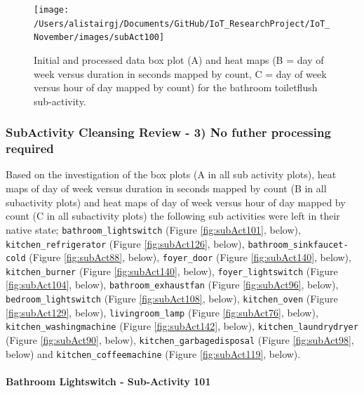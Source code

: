 \documentclass[11pt,]{article}
\let\oldparagraph\paragraph
\renewcommand{\paragraph}[1]{\oldparagraph{#1}\mbox{}}
\begin{document}
\begin{figure}[H]

{\centering \texttt{[image: /Users/alistairgj/Documents/GitHub/IoT\_ResearchProject/IoT\_November/images/subAct100]} 

}

\caption{Initial and processed data box plot (A) and heat maps (B = day of week versus duration in seconds mapped by count, C = day of week versus hour of day mapped by count) for the bathroom toiletflush sub-activity.}\label{fig:subAct100}
\end{figure}

\hypertarget{subactivity-cleansing-review---3-no-futher-processing-required}{%
\subsubsection{SubActivity Cleansing Review - 3) No futher processing
required}\label{subactivity-cleansing-review---3-no-futher-processing-required}}

Based on the investigation of the box plots (A in all sub activity
plots), heat maps of day of week versus duration in seconds mapped by
count (B in all subactivity plots) and heat maps of day of week versus
hour of day mapped by count (C in all subactivity plots) the following
sub activities were left in their native state;
\texttt{bathroom\_lightswitch} (Figure \ref{fig:subAct101}, below),
\texttt{kitchen\_refrigerator} (Figure \ref{fig:subAct126}, below),
\texttt{bathroom\_sinkfaucet-cold} (Figure \ref{fig:subAct88}, below),
\texttt{foyer\_door} (Figure \ref{fig:subAct140}, below),
\texttt{kitchen\_burner} (Figure \ref{fig:subAct140}, below),
\texttt{foyer\_lightswitch} (Figure \ref{fig:subAct104}, below),
\texttt{bathroom\_exhaustfan} (Figure \ref{fig:subAct96}, below),
\texttt{bedroom\_lightswitch} (Figure \ref{fig:subAct108}, below),
\texttt{kitchen\_oven} (Figure \ref{fig:subAct129}, below),
\texttt{livingroom\_lamp} (Figure \ref{fig:subAct76}, below),
\texttt{kitchen\_washingmachine} (Figure \ref{fig:subAct142}, below),
\texttt{kitchen\_laundrydryer} (Figure \ref{fig:subAct90}, below),
\texttt{kitchen\_garbagedisposal} (Figure \ref{fig:subAct98}, below) and
\texttt{kitchen\_coffeemachine} (Figure \ref{fig:subAct119}, below).

\hypertarget{bathroom-lightswitch---sub-activity-101}{%
\paragraph{Bathroom Lightswitch - Sub-Activity
101}\label{bathroom-lightswitch---sub-activity-101}}
\end{document}
